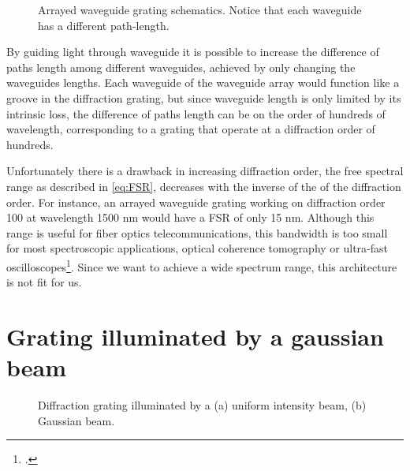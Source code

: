 \documentclass[12pt,twoside,english]{book}
\renewcommand{\~}{\perispomeni}%
\numberwithin{equation}{section}
\numberwithin{figure}{section}
\begin{document}
%
\begin{figure}[h]
\center{}
\caption{Arrayed waveguide grating schematics. Notice that each waveguide has a different path-length.\label{fig:awg}}

\end{figure}
By guiding light through waveguide it is possible to increase the difference of paths length among different waveguides, achieved by only changing the waveguides lengths. Each waveguide of the waveguide array would function like a groove in the diffraction grating, but since waveguide length is only limited by its intrinsic loss, the difference of paths length can be on the order of hundreds of wavelength, corresponding to a grating that operate at a diffraction order of hundreds.

Unfortunately there is a drawback in increasing diffraction order, the free spectral range as described in \ref{eq:FSR}, decreases with the inverse of the of the diffraction order. For instance, an arrayed waveguide grating working on diffraction order 100 at wavelength 1500 nm would have a FSR of only 15 nm. Although this range is useful for fiber optics telecommunications, this bandwidth is too small for most spectroscopic applications, optical coherence tomography or ultra-fast oscilloscopes\footcite{Foster:2008p71}. Since we want to achieve a wide spectrum range, this architecture is not fit for us.

\section{Grating illuminated by a gaussian beam}
\label{section:Grating gaussian beam}

%
\begin{figure}[h]
\centering
\caption{Diffraction grating illuminated by a (a) uniform intensity beam, (b) Gaussian beam.\label{fig:square-gaussian}} 
\end{figure}
\end{document}
